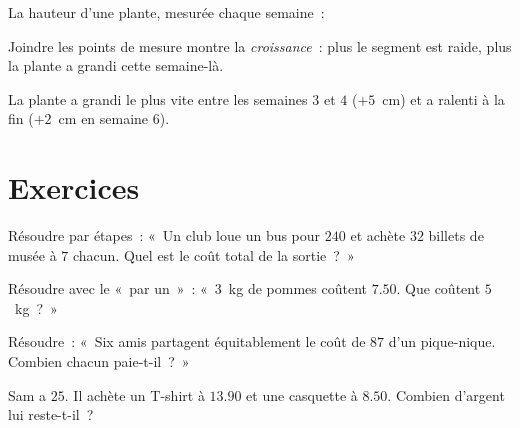 \begin{example}\label{ex:g5:data:line}
La hauteur d'une plante, mesurée chaque semaine~:

\begin{omfigure}

{\small Joindre les points de mesure montre la \emph{croissance}~:
plus le segment est raide, plus la plante a grandi cette
semaine-là.}
\end{omfigure}

La plante a grandi le plus vite entre les semaines $3$ et $4$
($+5$~cm) et a ralenti à la fin ($+2$~cm en semaine $6$).
\end{example}

\section{Exercices}

\begin{exercise}[$\star$]\label{exo:g5:data:1}
Résoudre par étapes~: «~Un club loue un bus pour $240$ et achète
$32$ billets de musée à $7$ chacun. Quel est le coût total de la
sortie~?~»
\end{exercise}

\begin{exercise}[$\star$]\label{exo:g5:data:2}
Résoudre avec le «~par un~»~: «~$3$~kg de pommes coûtent $7.50$.
Que coûtent $5$~kg~?~»
\end{exercise}

\begin{exercise}[$\star$]\label{exo:g5:data:3}
Résoudre~: «~Six amis partagent équitablement le coût de $87$ d'un
pique-nique. Combien chacun paie-t-il~?~»
\end{exercise}

\begin{exercise}[$\star$]\label{exo:g5:data:4}
Sam a $25$. Il achète un T-shirt à $13.90$ et une casquette à
$8.50$. Combien d'argent lui reste-t-il~?
\end{exercise}

